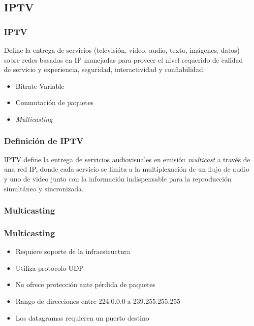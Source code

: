 \documentclass[a4paper,11pt]{beamer}
\begin{document}
	\subsection{IPTV}
		\begin{frame}
			\frametitle{IPTV}
			\begin{definition}
				Define la entrega de servicios (televisión, video, audio, texto, imágenes, datos) sobre redes basadas en IP manejadas para proveer el nivel requerido de calidad de servicio y experiencia, seguridad, interactividad y confiabilidad.
			\end{definition}
			\begin{itemize}
				\item Bitrate Variable
				\item Conmutación de paquetes
				\item \emph{Multicasting}
			\end{itemize}			
		\end{frame}

		\begin{frame}
			\frametitle{Definición de IPTV}
			\begin{definition}
			IPTV define la entrega de servicios audiovisuales en emisión \emph{multicast} a través de una red IP, donde cada servicio se limita a la multiplexación de un flujo de audio y uno de video junto con la información indispensable para la reproducción simultánea y sincronizada.
			\end{definition}			
		\end{frame}
		
		\subsubsection{Multicasting}
		\begin{frame}
			\frametitle{Multicasting}
			\begin{itemize}
				\item Requiere soporte de la infraestructura
				\item Utiliza protocolo UDP
				\item No ofrece protección ante pérdida de paquetes
				\item Rango de direcciones entre 224.0.0.0 a 239.255.255.255
				\item Los datagramas requieren un puerto destino
			\end{itemize}
		\end{frame}
\end{document}
